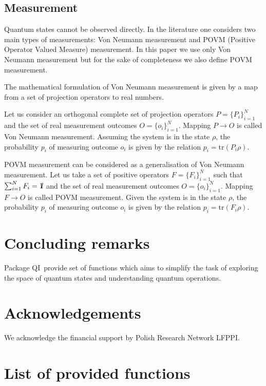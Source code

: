 \documentclass[a4paper,11pt]{elsart}
\newcommand{\1}{{\rm 1\hspace{-0.9mm}l}}
\newcommand{\tr}{\mathrm{tr}}
\newcommand{\qi}{QI}
\begin{document}
\subsection{Measurement}
Quantum states cannot be observed directly. In the literature one considers two
main types of measurements: Von Neumann measurement and POVM (Positive Operator
Valued Measure) measurement. In this paper we use only Von Neumann
measurement but for the sake of completeness we also define POVM measurement.

The mathematical formulation of Von Neumann measurement is given by a map from 
a
set of projection operators to real numbers. 

Let us consider an orthogonal complete set of projection operators 
$P=\{P_i\}_{i=1}^N$ and
the set of real measurement outcomes $O=\{o_i\}_{i=1}^N$. Mapping $P\rightarrow
O$ is called Von Neumann measurement. Assuming the system is in the state 
$\rho$,
the probability $p_i$ of measuring outcome $o_i$ is given by the relation 
$p_i=\tr(P_i
\rho)$.

POVM measurement can be considered as a generalisation of Von Neumann
measurement. Let us take a set of positive operators $F=\{F_i\}_{i=1}^N$ such
that $\sum_{i=1}^N F_i=\1$ and the set of real measurement outcomes
$O=\{o_i\}_{i=1}^N$. Mapping $F\rightarrow O$ is called POVM measurement. Given
the system is in the state $\rho$, the probability $p_i$ of measuring outcome 
$o_i$
is given by the relation $p_i=\tr(F_i \rho)$.

\section{Concluding remarks}\label{sec:comclude}
Package \qi\ provide set of functions which aims to simplify the task of
exploring the space of quantum states and understanding quantum operations.

\section*{Acknowledgements}
We acknowledge the financial support by Polish Research Network LFPPI.

\appendix
\section{List of provided functions}

%



\end{document}
